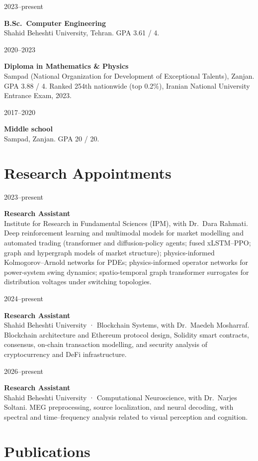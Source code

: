 \documentclass[11pt,a4paper]{article}
\newcommand{\entry}[3]{%
  \noindent
  \begin{minipage}[t]{2.4cm}\raggedright\small\color{muted}#1\end{minipage}%
  \hspace{0.4cm}%
  \begin{minipage}[t]{\dimexpr\textwidth-2.8cm\relax}%
    \textbf{#2}\\[0.12em]
    {\small #3}%
  \end{minipage}%
  \par\vspace{0.38em}%
}
\begin{document}
\entry{2023--present}{B.Sc.\ Computer Engineering}{Shahid Beheshti University, Tehran. GPA 3.61 / 4.}

\entry{2020--2023}{Diploma in Mathematics \& Physics}{Sampad (National Organization for Development of Exceptional Talents), Zanjan. GPA 3.88 / 4. Ranked 254th nationwide (top 0.2\%), Iranian National University Entrance Exam, 2023.}

\entry{2017--2020}{Middle school}{Sampad, Zanjan. GPA 20 / 20.}

\section*{Research Appointments}

\entry{2023--present}{Research Assistant}{Institute for Research in Fundamental Sciences (IPM), with Dr.\ Dara Rahmati. Deep reinforcement learning and multimodal models for market modelling and automated trading (transformer and diffusion-policy agents; fused xLSTM--PPO; graph and hypergraph models of market structure); physics-informed Kolmogorov--Arnold networks for PDEs; physics-informed operator networks for power-system swing dynamics; spatio-temporal graph transformer surrogates for distribution voltages under switching topologies.}

\entry{2024--present}{Research Assistant}{Shahid Beheshti University · Blockchain Systems, with Dr.\ Maedeh Mosharraf. Blockchain architecture and Ethereum protocol design, Solidity smart contracts, consensus, on-chain transaction modelling, and security analysis of cryptocurrency and DeFi infrastructure.}

\entry{2026--present}{Research Assistant}{Shahid Beheshti University · Computational Neuroscience, with Dr.\ Narjes Soltani. MEG preprocessing, source localization, and neural decoding, with spectral and time--frequency analysis related to visual perception and cognition.}

\section*{Publications}
\end{document}
